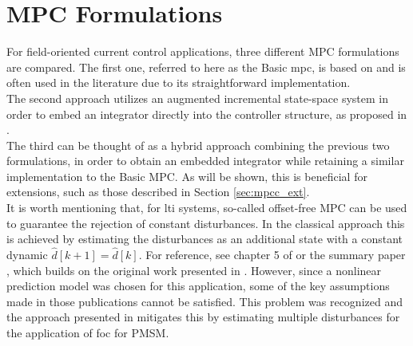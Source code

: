 \section{MPC Formulations} \label{sec:mpc_formulations}
For field-oriented current control applications, three different MPC formulations are compared. The first one, referred to here as the Basic \acrshort{mpc}, is based on \cite{mpcCamacho} \cite{mpcRawlings} and is often used in the literature due to its straightforward implementation.\\
The second approach utilizes an augmented incremental state-space system in order to embed an integrator directly into the controller structure, as proposed in \cite{mpcWang}.\\
The third can be thought of as a hybrid approach combining the previous two formulations, in order to obtain an embedded integrator while retaining a similar implementation to the Basic MPC. As will be shown, this is beneficial for extensions, such as those described in Section \ref{sec:mpcc_ext}.\\
It is worth mentioning that, for \acrshort{lti} systems, so-called offset-free MPC can be used to guarantee the rejection of constant disturbances. In the classical approach this is achieved by estimating the disturbances as an additional state with a constant dynamic $\hat{d}[k+1] = \hat{d}[k]$. For reference, see chapter 5 of \cite{mpcRawlings} or the summary paper \cite{ofmpcBM} , which builds on the original work presented in \cite{ofmpcPGR}. However, since a nonlinear prediction model was chosen for this application, some of the key assumptions made in those publications cannot be satisfied. This problem was recognized and the approach presented in \cite{ofmpcDistObs} mitigates this by estimating multiple disturbances for the application of \acrshort{foc} for PMSM.  

